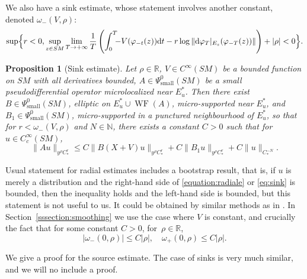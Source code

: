 \documentclass[10pt]{amsart}
\newcommand{\R}{\mathbb{R}}
\newcommand{\N}{\mathbb{N}}
\newcommand{\dd}{\mathrm{d}}
\DeclareMathOperator{\WF}{WF}
\theoremstyle{plain}
\newtheorem{proposition}{Proposition}[section]
\theoremstyle{definition}
\begin{document}
We also have a sink estimate, whose statement involves another constant, denoted $\omega_-(V,\rho)$:
\small
\begin{equation*}
\sup\Bigl\{r < 0, \sup_{z \in SM} \lim_{T \to +\infty} \frac{1}{T} \left(\int_0^T\hspace{-5pt} - V(\varphi_{-t}(z)) \dd t - r \log \|\dd \varphi_{T}|_{E_s}(\varphi_{-T}(z))\|\right) + |\rho| < 0 \Bigr\}.
\end{equation*}
\normalsize
\begin{proposition}[Sink estimate]
\label{proposition:sink}
Let $\rho\in\R$, $V\in C^\infty(SM)$ be a bounded function on $SM$ with all derivatives bounded, $A\in \Psi^0_{\mathrm{small}}(SM)$ be a small pseudodifferential operator microlocalized near $E^\ast_u$. Then there exist $B\in\Psi^0_{\mathrm{small}}(SM)$, elliptic on $E^\ast_u\cup\WF(A)$, micro-supported near $E^\ast_u$, and $B_1\in\Psi^0_{\mathrm{small}}(SM)$, micro-supported in a punctured neighbourhood of $E^\ast_u$, so that for $r< \omega_-(V,\rho)$ and $N\in\N$, there exists a constant $C>0$ such that for $u\in C^\infty_c(SM)$,
\begin{equation}\label{eq:sink}
\|Au\|_{y^\rho C^r_\ast} \leq C \| B (X+V)u\|_{y^\rho C^r_\ast} + C\|B_1 u\|_{y^\rho C^r_\ast} + C\|u\|_{C^{-N}_\ast}.
\end{equation}
\end{proposition}

Usual statement for radial estimates includes a bootstrap result, that is, if $u$ is merely a distribution and the right-hand side of \eqref{equation:radiale} or \eqref{eq:sink} is bounded, then the inequality holds and the left-hand side is bounded, but this statement is not useful to us. It could be obtained by similar methods as in \cite{Bonthonneau-Lefeuvre-21}. In Section~\ref{sssection:smoothing} we use the case where $V$ is constant, and crucially the fact that for some constant $C>0$, for~$\rho\in\R$,
\[
|\omega_-(0,\rho)| \leq C |\rho|,\quad \omega_+(0,\rho)\leq C|\rho|.
\]

We give a proof for the source estimate. The case of sinks is very much similar, and we will no include a proof.

\end{document}
